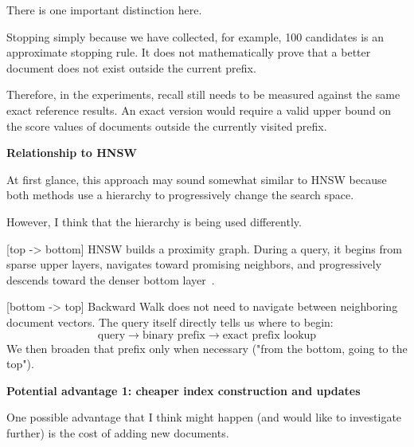 There is one important distinction here.

Stopping simply because we have collected, for example, 100 candidates is an approximate
stopping rule. It does not mathematically prove that a better document does not exist
outside the current prefix.

Therefore, in the experiments, recall still needs to be measured against the same exact
reference results. An exact version would require a valid upper bound on the score values of
documents outside the currently visited prefix.

\textbf{Relationship to HNSW}\par
At first glance, this approach may sound somewhat similar to HNSW because both methods use
a hierarchy to progressively change the search space.

However, I think that the hierarchy is being used differently.

[top -> bottom] HNSW builds a proximity graph. During a query, it begins from sparse upper layers, navigates
toward promising neighbors, and progressively descends toward the denser bottom layer~\cite{hnsw}.

[bottom -> top] Backward Walk does not need to navigate between neighboring document vectors. The query
itself directly tells us where to begin:
\[
\text{query}\to\text{binary prefix}\to\text{exact prefix lookup}
\]
We then broaden that prefix only when necessary ("from the bottom, going to the top").


\textbf{Potential advantage 1: cheaper index construction and updates}\par
One possible advantage that I think might happen (and would like to investigate further) is the cost of adding new documents.

